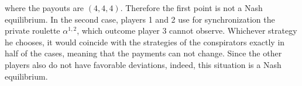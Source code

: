 where the payouts are $(4, 4, 4)$. Therefore the first point is not a Nash equilibrium. In the second case, players 1 and 2 use for synchronization the private roulette $\alpha^{1, 2}$, which outcome player 3 cannot observe. Whichever strategy he chooses, it would coincide with the strategies of the conspirators exactly in half of the cases, meaning that the payments can not change. Since the other players also do not have favorable deviations, indeed, this situation is a Nash equilibrium. %

